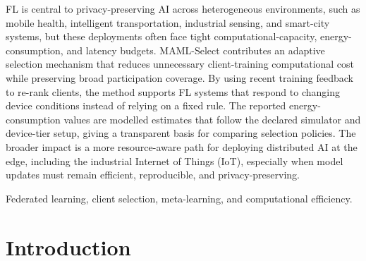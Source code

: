 \documentclass[journal]{IEEEtran}
\theoremstyle{remark}
\newcommand{\revision}[1]{#1}
\begin{document}
\begin{abstract}
{After the selected clients return their updates, the same policy is meta-updated using the new feedback. We evaluate MAML-Select on Fashion-MNIST, CIFAR-10, and CIFAR-100 with 100 clients, K = 10 selected clients per round, a Dirichlet non-IID split with $\alpha=0.5$, and three random seeds. On Fashion-MNIST, CIFAR-10, and CIFAR-100, MAML-Select provides competitive accuracy with significantly lower cumulative Tera Floating-Point Operations (TFLOPs) and modelled energy consumption. Higher values of Jain-index values also demonstrates the fairness of the proposed method. %
}
\end{abstract}
\renewcommand\IEEEkeywordsname{Impact Statement}
\begin{IEEEkeywords}
\revision{FL is central to privacy-preserving AI across heterogeneous environments, such as mobile health, intelligent transportation, industrial sensing, and smart-city systems, but these deployments often face tight computational-capacity, energy-consumption, and latency budgets. MAML-Select contributes an adaptive selection mechanism that reduces unnecessary client-training computational cost while preserving broad participation coverage. By using recent training feedback to re-rank clients, the method supports FL systems that respond to changing device conditions instead of relying on a fixed rule. The reported energy-consumption values are modelled estimates that follow the declared simulator and device-tier setup, giving a transparent basis for comparing selection policies. The broader impact is a more resource-aware path for deploying distributed AI at the edge, including the industrial Internet of Things (IoT), especially when model updates must remain efficient, reproducible, and privacy-preserving.}


\end{IEEEkeywords}
\renewcommand\IEEEkeywordsname{Index Terms}
\begin{IEEEkeywords}
Federated learning, client selection, meta-learning, and computational efficiency.
\end{IEEEkeywords}
\section{Introduction}
\end{document}
